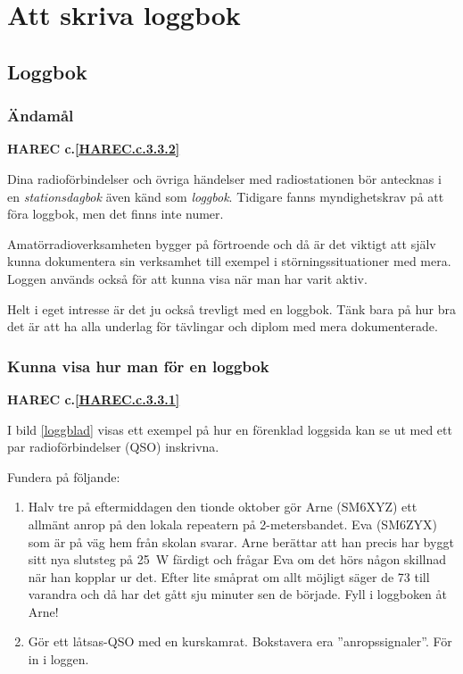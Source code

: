 \chapter{Att skriva loggbok}

\section{Loggbok}

\subsection{Ändamål}
\textbf{HAREC
  c.\ref{HAREC.c.3.3.2}\label{myHAREC.c.3.3.2}
}

Dina radioförbindelser och övriga händelser med radiostationen bör
antecknas i en \emph{stationsdagbok} även känd som \emph{loggbok}.
Tidigare fanns myndighetskrav på att föra loggbok, men det finns inte numer.

Amatörradioverksamheten bygger på förtroende och då är det viktigt att själv
kunna dokumentera sin verksamhet till exempel i störningssituationer med mera.
Loggen används också för att kunna visa när man har varit aktiv.

Helt i eget intresse är det ju också trevligt med en loggbok.
Tänk bara på hur bra det är att ha alla underlag för tävlingar och diplom
med mera dokumenterade.

\subsection{Kunna visa hur man för en loggbok}
\textbf{HAREC
  c.\ref{HAREC.c.3.3.1}\label{myHAREC.c.3.3.1}
}

I bild \ref{loggblad} visas ett exempel på hur en förenklad loggsida kan se ut
med ett par radioförbindelser (QSO) inskrivna.

Fundera på följande:
\begin{enumerate}
\item Halv tre på eftermiddagen den tionde oktober gör Arne (SM6XYZ)
  ett allmänt anrop på den lokala repeatern på 2-metersbandet.
  Eva (SM6ZYX) som är på väg hem från skolan svarar.
  Arne berättar att han precis har byggt sitt nya slutsteg på 25~W
  färdigt och frågar Eva om det hörs någon skillnad när han kopplar ur det.
  Efter lite småprat om allt möjligt säger de 73 till varandra och då har det
  gått sju minuter sen de började.
  Fyll i loggboken åt Arne!
\item Gör ett låtsas-QSO med en kurskamrat.
  Bokstavera era ''anropssignaler''.
  För in i loggen.
\end{enumerate}

